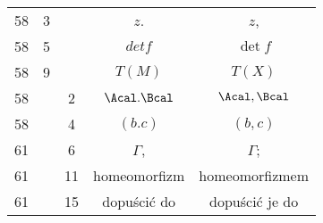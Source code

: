 \documentclass[a4paper,11pt]{article}
\numberwithin{equation}{section}
\begin{document}
\begin{center}
\begin{tabular}{|c|c|c|c|c|}
    58  & \hphantom{0}3 & & $z$. & $z$, \\
    58  & \hphantom{0}5 & & $det f$ & $\det f$ \\
    58  & \hphantom{0}9 & & $T( M )$ & $T( X )$ \\
    58  & & \hphantom{0}2 & $\Acal.\Bcal$ & $\Acal, \Bcal$ \\
    58  & & \hphantom{0}4 & $( b.c )$ & $( b, c )$ \\
    61  & & \hphantom{0}6 & $\Gamma$, & $\Gamma$; \\
    61  & & 11 & homeomorfizm & homeomorfizmem \\
    61  & & 15 & dopuścić do & dopuścić je do \\
    \hline
  \end{tabular}





  \newpage


\end{center}
\end{document}
